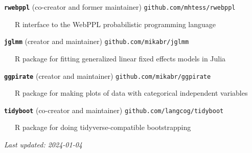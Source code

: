 \documentclass[11pt,]{article}
\begin{document}
\textbf{\texttt{rwebppl}} (co-creator and former maintainer)
\hfill \texttt{github.com/mhtess/rwebppl}\\
\strut ~~~R interface to the WebPPL probabilistic programming language

\textbf{\texttt{jglmm}} (creator and maintainer)
\hfill \texttt{github.com/mikabr/jglmm}\\
\strut ~~~R package for fitting generalized linear fixed effects models
in Julia

\textbf{\texttt{ggpirate}} (creator and maintainer)
\hfill \texttt{github.com/mikabr/ggpirate}\\
\strut ~~~R package for making plots of data with categorical
independent variables

\textbf{\texttt{tidyboot}} (co-creator and maintainer)
\hfill \texttt{github.com/langcog/tidyboot}\\
\strut ~~~R package for doing tidyverse-compatible bootstrapping

\centering
\vspace{2em}

\emph{Last updated: 2024-01-04}
\end{document}
